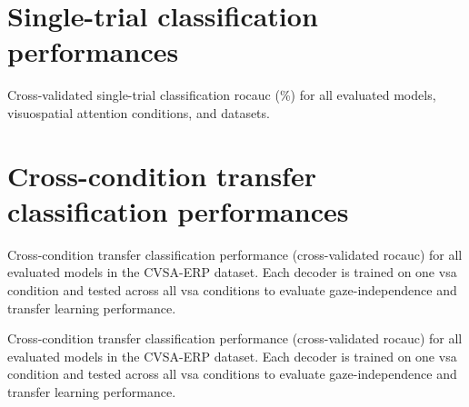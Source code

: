 \clearpage
\begin{subappendices}
  \section{Single-trial classification performances}
  \begin{table}[ht]
  
    \caption[Classification performances.]{Cross-validated single-trial
    classification \ac{rocauc} (\%) for all evaluated models, visuospatial attention conditions, and
    datasets.}
    \label{tab:covert-align/results/single-trial}
  \end{table}
  \clearpage
  \section{Cross-condition transfer classification performances}
  \begin{table}[ht]
      
      \caption[Transfer learning results for CVSA-ERP]{Cross-condition transfer
      classification performance (cross-validated \ac{rocauc})
      for all evaluated models in the CVSA-ERP dataset. Each decoder is trained
      on one \ac{vsa} condition and tested across all
      \ac{vsa}
      conditions to evaluate gaze-independence and transfer learning
      performance.}
  \end{table}
  \clearpage
  \begin{table}[ht]
      
      \caption[Transfer learning results for BNCI2014-009]{Cross-condition transfer
      classification performance (cross-validated \ac{rocauc})
      for all evaluated models in the CVSA-ERP dataset. Each decoder is trained
      on one \ac{vsa} condition and tested across all \ac{vsa}
      conditions to evaluate gaze-independence and transfer learning
      performance.}
  \end{table}
\end{subappendices}

